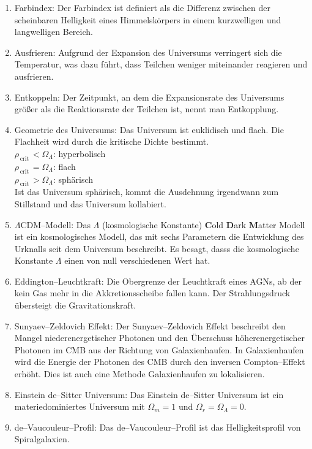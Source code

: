\documentclass[a4paper,12pt]{article}
\numberwithin{equation}{section}
\begin{document}
\begin{enumerate}[label=$\circ$]
        \item Farbindex: Der Farbindex ist definiert als die Differenz zwischen der scheinbaren Helligkeit eines Himmelskörpers in einem kurzwelligen und langwelligen Bereich.
        \item Ausfrieren: Aufgrund der Expansion des Universums verringert sich die Temperatur, was dazu führt, dass Teilchen weniger miteinander reagieren und ausfrieren.
        \item Entkoppeln: Der Zeitpunkt, an dem die Expansionsrate des Universums größer als die Reaktionsrate der Teilchen ist, nennt man Entkopplung. 
        \item Geometrie des Universums: Das Universum ist euklidisch und flach. Die Flachheit wird durch die kritische Dichte bestimmt.\\\indent
                $\rho _{\,\text{crit}\,}<\Omega _\Lambda $: hyperbolisch\\\indent
                $\rho _{\,\text{crit}\,}=\Omega _\Lambda $: flach\\\indent
                $\rho _{\,\text{crit}\,}>\Omega _\Lambda $: sphärisch\\
                Ist das Universum sphärisch, kommt die Ausdehnung irgendwann zum Stillstand und das Universum kollabiert.
        \item $\Lambda $CDM--Modell: Das $\Lambda $ (kosmologische Konstante) \textbf{C}old \textbf{D}ark \textbf{M}atter Modell ist ein kosmologisches Modell, das mit sechs Parametern die Entwicklung des Urknalls seit dem Universum beschreibt. Es besagt, dasss die kosmologische Konstante $\Lambda $ einen von null verschiedenen Wert hat.
        \item Eddington--Leuchtkraft: Die Obergrenze der Leuchtkraft eines AGNs, ab der kein Gas mehr in die Akkretionsscheibe fallen kann. Der Strahlungsdruck übersteigt die Gravitationskraft.
        \item Sunyaev--Zeldovich Effekt: Der Sunyaev--Zeldovich Effekt beschreibt den Mangel niederenergetischer Photonen und den Überschuss höherenergetischer Photonen im CMB aus der Richtung von Galaxienhaufen. In Galaxienhaufen wird die Energie der Photonen des CMB durch den inversen Compton--Effekt erhöht. Dies ist auch eine Methode Galaxienhaufen zu lokalisieren.
        \item Einstein de--Sitter Universum: Das Einstein de--Sitter Universum ist ein materiedominiertes Universum mit $\Omega _m=1$ und $\Omega _r=\Omega _\Lambda =0$.
        \item de--Vaucouleur--Profil: Das de--Vaucouleur--Profil ist das Helligkeitsprofil von Spiralgalaxien.

\end{enumerate}
\end{document}
